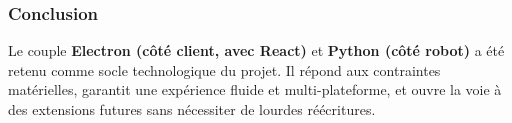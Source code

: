 \subsubsection{Conclusion}

Le couple \textbf{Electron (côté client, avec React)} et \textbf{Python (côté robot)} a été retenu comme socle technologique du projet.  
Il répond aux contraintes matérielles, garantit une expérience fluide et multi-plateforme, et ouvre la voie à des extensions futures sans nécessiter de lourdes réécritures.
